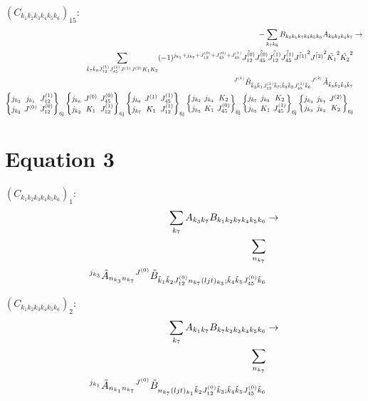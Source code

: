 \documentclass[11pt]{article}
\newcommand{\sixj}[6]{\begingroup\setlength{\arraycolsep}{0.2em}\begin{Bmatrix} #1 & #2 & #3 \\ #4 & #5 & #6 \end{Bmatrix}_{\text{6j}}\endgroup}
\begin{document}
$\left({C}_{{k}_{1}{k}_{2}{k}_{3}{k}_{4}{k}_{5}{k}_{6}}\right)_{15}$:
\begin{align}
-\sum_{{k}_{7}{k}_{8}}{B}_{{k}_{3}{k}_{1}{k}_{7}{k}_{8}{k}_{5}{k}_{6}}{A}_{{k}_{8}{k}_{2}{k}_{4}{k}_{7}}&\rightarrow \notag \\\sum_{\tilde{k}_{7}\tilde{k}_{8}J^{(1)}_{12}J^{(1)}_{45}J^{(1)}J^{(2)}K_{1}K_{2}}(-1)^{j_{{k}_{1}} +j_{{k}_{7}} +J^{(0)}_{12} +J^{(0)}_{45} +J^{(1)}_{45} }\hat{J^{(0)}_{12}}\hat{J^{(0)}_{45}}\hat{J^{(1)}_{12}}\hat{J^{(1)}_{45}}\hat{J^{(1)}}^{2}\hat{J^{(2)}}^{2}\hat{K_{1}}^{2}\hat{K_{2}}^{2}& \notag \\{}^{J^{(1)}}\tilde{B}_{\tilde{k}_{3}\tilde{k}_{1}J^{(1)}_{12}\tilde{k}_{7};\tilde{k}_{8}\tilde{k}_{5}J^{(1)}_{45}\tilde{k}_{6}}{}^{J^{(2)}}\tilde{A}_{\tilde{k}_{8}\tilde{k}_{2}\tilde{k}_{4}\tilde{k}_{7}}& \notag \\\sixj{j_{{k}_{3}}}{j_{{k}_{1}}}{J^{(1)}_{12}}{j_{{k}_{2}}}{J^{(0)}}{J^{(0)}_{12}}\sixj{j_{{k}_{6}}}{J^{(0)}}{J^{(0)}_{45}}{j_{{k}_{2}}}{K_{1}}{J^{(1)}_{12}}\sixj{j_{{k}_{6}}}{J^{(1)}}{J^{(1)}_{45}}{j_{{k}_{7}}}{K_{1}}{J^{(1)}_{12}}\sixj{j_{{k}_{2}}}{j_{{k}_{4}}}{K_{2}}{j_{{k}_{5}}}{K_{1}}{J^{(0)}_{45}}\sixj{j_{{k}_{7}}}{j_{{k}_{8}}}{K_{2}}{j_{{k}_{5}}}{K_{1}}{J^{(1)}_{45}}\sixj{j_{{k}_{4}}}{j_{{k}_{7}}}{J^{(2)}}{j_{{k}_{8}}}{j_{{k}_{2}}}{K_{2}}
\end{align}

\section{Equation 3}
$\left({C}_{{k}_{1}{k}_{2}{k}_{3}{k}_{4}{k}_{5}{k}_{6}}\right)_{1}$:
\begin{align}
\sum_{{k}_{7}}{A}_{{k}_{3}{k}_{7}}{B}_{{k}_{1}{k}_{2}{k}_{7}{k}_{4}{k}_{5}{k}_{6}}&\rightarrow \notag \\\sum_{n_{{k}_{7}}}& \notag \\{}^{j_{{k}_{3}}}\tilde{A}_{n_{{k}_{3}}n_{{k}_{7}}}{}^{J^{(0)}}\tilde{B}_{\tilde{k}_{1}\tilde{k}_{2}J^{(0)}_{12}n_{{k}_{7}}(ljt)_{{k}_{3}};\tilde{k}_{4}\tilde{k}_{5}J^{(0)}_{45}\tilde{k}_{6}}& \notag \\
\end{align}

$\left({C}_{{k}_{1}{k}_{2}{k}_{3}{k}_{4}{k}_{5}{k}_{6}}\right)_{2}$:
\begin{align}
\sum_{{k}_{7}}{A}_{{k}_{1}{k}_{7}}{B}_{{k}_{7}{k}_{2}{k}_{3}{k}_{4}{k}_{5}{k}_{6}}&\rightarrow \notag \\\sum_{n_{{k}_{7}}}& \notag \\{}^{j_{{k}_{1}}}\tilde{A}_{n_{{k}_{1}}n_{{k}_{7}}}{}^{J^{(0)}}\tilde{B}_{n_{{k}_{7}}(ljt)_{{k}_{1}}\tilde{k}_{2}J^{(0)}_{12}\tilde{k}_{3};\tilde{k}_{4}\tilde{k}_{5}J^{(0)}_{45}\tilde{k}_{6}}& \notag \\
\end{align}
\end{document}
